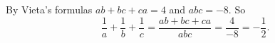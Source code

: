 By Vieta's formulas $ab+bc+ca=4$ and $abc=-8$. So
\[
\dfrac{1}{a}+\dfrac{1}{b}+\dfrac{1}{c}=\dfrac{ab+bc+ca}{abc}=\dfrac{4}{-8}=\boxed{-\dfrac{1}{2}}.
\]
